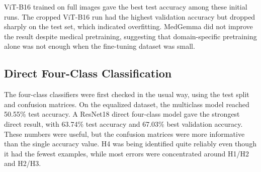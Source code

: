 ﻿\documentclass[12pt,a4paper]{report}
\begin{document}
\begin{table}[H]
\centering
{}
\caption{Earlier Heckmatt grading results across backbone architectures}
\label{tab:heckmatt_old_results}
\end{table}

ViT-B16 trained on full images gave the best test accuracy among these initial runs. The cropped ViT-B16 run had the highest validation accuracy but dropped sharply on the test set, which indicated overfitting. MedGemma did not improve the result despite medical pretraining, suggesting that domain-specific pretraining alone was not enough when the fine-tuning dataset was small.

\subsection{Direct Four-Class Classification}
The four-class classifiers were first checked in the usual way, using the test split and confusion matrices. On the equalized dataset, the multiclass model reached 50.55\% test accuracy. A ResNet18 direct four-class model gave the strongest direct result, with 63.74\% test accuracy and 67.03\% best validation accuracy. These numbers were useful, but the confusion matrices were more informative than the single accuracy value. H4 was being identified quite reliably even though it had the fewest examples, while most errors were concentrated around H1/H2 and H2/H3.

\begin{table}[H]
\centering
{}
\caption{Direct multiclass classification results}
\label{tab:direct_multiclass}
\end{table}
\end{document}
